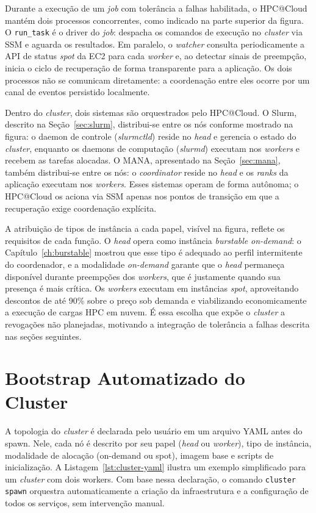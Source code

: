 Durante a execução de um \textit{job} com tolerância a falhas habilitada, o HPC@Cloud mantém dois processos concorrentes, como indicado na parte superior da figura. O \texttt{run\_task} é o driver do \textit{job}: despacha os comandos de execução no \textit{cluster} via SSM e aguarda os resultados. Em paralelo, o \textit{watcher} consulta periodicamente a API de status \textit{spot} da EC2 para cada \textit{worker} e, ao detectar sinais de preempção, inicia o ciclo de recuperação de forma transparente para a aplicação. Os dois processos não se comunicam diretamente: a coordenação entre eles ocorre por um canal de eventos persistido localmente.

Dentro do \textit{cluster}, dois sistemas são orquestrados pelo HPC@Cloud. O Slurm, descrito na Seção~\ref{sec:slurm}, distribui-se entre os nós conforme mostrado na figura: o daemon de controle (\textit{slurmctld}) reside no \textit{head} e gerencia o estado do \textit{cluster}, enquanto os daemons de computação (\textit{slurmd}) executam nos \textit{workers} e recebem as tarefas alocadas. O MANA, apresentado na Seção~\ref{sec:mana}, também distribui-se entre os nós: o \textit{coordinator} reside no \textit{head} e os \textit{ranks} da aplicação executam nos \textit{workers}. Esses sistemas operam de forma autônoma; o HPC@Cloud os aciona via SSM apenas nos pontos de transição em que a recuperação exige coordenação explícita.

A atribuição de tipos de instância a cada papel, visível na figura, reflete os requisitos de cada função. O \textit{head} opera como instância \textit{burstable} \textit{on-demand}: o Capítulo~\ref{ch:burstable} mostrou que esse tipo é adequado ao perfil intermitente do coordenador, e a modalidade \textit{on-demand} garante que o \textit{head} permaneça disponível durante preempções dos \textit{workers}, que é justamente quando sua presença é mais crítica. Os \textit{workers} executam em instâncias \textit{spot}, aproveitando descontos de até 90\% sobre o preço sob demanda e viabilizando economicamente a execução de cargas HPC em nuvem. É essa escolha que expõe o \textit{cluster} a revogações não planejadas, motivando a integração de tolerância a falhas descrita nas seções seguintes.

\section{Bootstrap Automatizado do Cluster}
\label{sec:bootstrap}

A topologia do \textit{cluster} é declarada pelo usuário em um arquivo YAML antes do spawn.
Nele, cada nó é descrito por seu papel (\textit{head} ou \textit{worker}), tipo de
instância, modalidade de alocação (on-demand ou spot), imagem base e scripts de
inicialização. A Listagem~\ref{lst:cluster-yaml} ilustra um exemplo simplificado
para um \textit{cluster} com dois workers. Com base nessa declaração, o comando
\texttt{cluster spawn} orquestra automaticamente a criação da infraestrutura e a
configuração de todos os serviços, sem intervenção manual.

